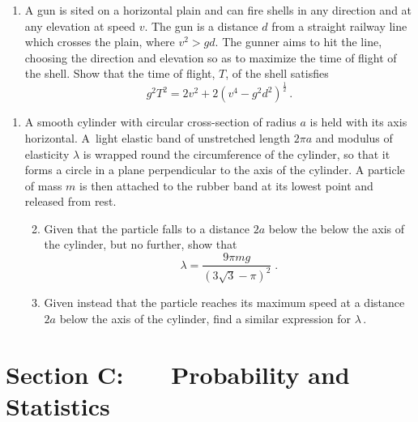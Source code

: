 \documentclass[a4, 11pt]{report}
\newlength{\qspace}
\newcounter{qnumber}
\newenvironment{question}%
 {\vspace{\qspace}
  \begin{enumerate}[\bfseries 1\quad][10]%
    \setcounter{enumi}{\value{qnumber}}%
    \item%
 }
{
  \end{enumerate}
  \filbreak
  \stepcounter{qnumber}
 }
\newenvironment{questionparts}[1][1]%
 {
  \begin{enumerate}[\bfseries (i)]%
    \setcounter{enumii}{#1}
    \addtocounter{enumii}{-1}
    \setlength{\itemsep}{5mm}
    \setlength{\parskip}{8pt}
 }
 {
  \end{enumerate}
 }
\begin{document}
\begin{question}	
A gun is 
sited on a horizontal plain and can fire 
shells in any direction and at any elevation at speed $v$.
The gun is a distance $d$ from 
a straight railway line which crosses the plain, where
$v^2>gd$. The gunner  
aims to hit the line, choosing the direction and elevation 
so as to maximize the time of flight of the shell. Show that 
 the time of 
flight, $T$, of the shell satisfies 
\[
g^2 T^2 = 2 v^2 +2 \left(v^4 -g^2d^2\right)^{\frac12}\,.
\]

\end{question}


\begin{question}
A smooth cylinder with circular cross-section of radius $a$ is held
with its axis horizontal. A~light elastic band of unstretched 
length $2\pi a$ and modulus of elasticity
$\lambda$ is wrapped round the circumference of the cylinder, so that it forms a circle 
in a plane perpendicular to the axis of the cylinder. A particle of mass $m$ is then
attached to the  rubber band at its lowest point and released from rest.

\begin{questionparts}
\item Given that the particle falls to a distance $2a$ below the
below the axis of the cylinder, but no further, show that
\[
\lambda = \frac{9\pi m g}{(3\sqrt3-\pi)^2} \;.
\]
\item Given instead that the particle reaches its maximum speed at a
distance $2a$ below the axis of the cylinder, find a similar expression for 
$\lambda$\,.
\end{questionparts} 
\end{question}
	

	
	\newpage
\section*{Section C: \ \ \ Probability and Statistics}
\end{document}

